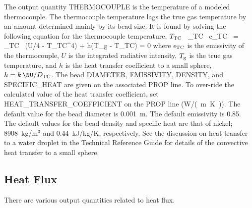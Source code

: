 \documentclass[11pt]{book}
\begin{document}
The output quantity {\ct THERMOCOUPLE} is the temperature of a modeled thermocouple. The thermocouple temperature lags the true gas temperature by an amount determined mainly by its bead size. It is found by solving the following equation for the thermocouple temperature, $T_{\rm TC}$~\cite{Welsh:1}
\be
   \rho_{\rm TC} \, c_{\rm TC} \,  = \epsilon_{\rm TC} \, (U/4 - \sigma T_{\rm TC}^4) + h(T_{\rm g} - T_{\rm TC}) = 0
   \label{TC}
\ee
where $\epsilon_{\rm TC}$ is the emissivity of the thermocouple, $U$ is the integrated radiative intensity, $T_{\rm g}$ is the true gas temperature, and $h$ is the heat transfer coefficient to a small sphere, $h=k \, \NU / D_{\rm TC}$. The bead {\ct DIAMETER}, {\ct EMISSIVITY}, {\ct DENSITY}, and {\ct SPECIFIC\_HEAT} are given on the associated {\ct PROP} line. To over-ride the calculated value of the heat transfer coefficient, set {\ct HEAT\_TRANSFER\_COEFFICIENT} on the {\ct PROP} line (\si{W/(m.K)}). The default value for the bead diameter is 0.001~m. The default emissivity is 0.85. The default values for the bead density and specific heat are that of nickel; 8908~kg/m$^3$ and 0.44~kJ/kg/K, respectively. See the discussion on heat transfer to a water droplet in the Technical Reference Guide for details of the convective heat transfer to a small sphere.


\subsection{Heat Flux}
\label{info:heat_flux}

There are various output quantities related to heat flux.
\end{document}
